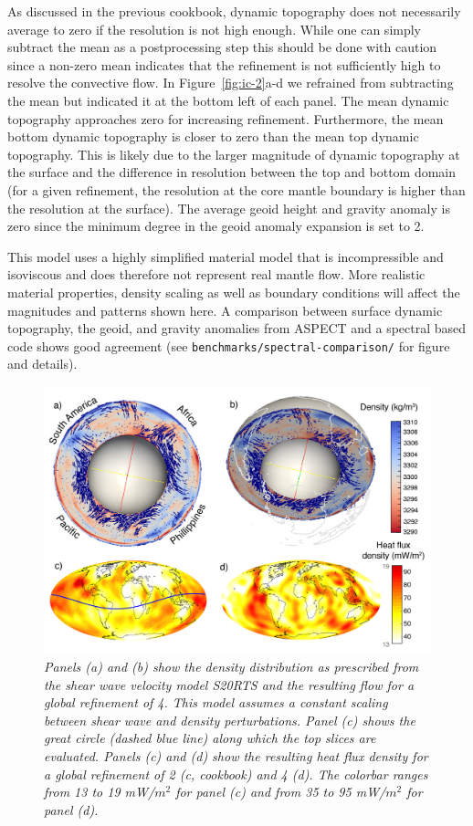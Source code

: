 \documentclass{article}
\begin{document}
As discussed in the previous cookbook, dynamic topography does not necessarily
average to zero if the resolution is not high enough. While one can simply subtract
the mean as a postprocessing step this should be done with caution since a non-zero
mean indicates that the refinement is not sufficiently high to resolve the
convective flow. In Figure~\ref{fig:ic-2}a-d we refrained from subtracting the mean but
indicated it at the bottom left of each panel. The mean dynamic
topography approaches zero for increasing refinement. Furthermore, the mean bottom
dynamic topography is closer to zero than the mean top dynamic topography. This is
likely due to the larger magnitude of dynamic topography at the surface and the
difference in resolution between the top and bottom domain
(for a given refinement, the resolution at the core mantle boundary is
higher than the resolution at the surface). The average geoid height and gravity anomaly
is zero since the minimum degree in the geoid anomaly expansion is set to 2.

This model uses a highly simplified material model that is incompressible and
isoviscous and does therefore not represent real mantle flow. More realistic
material properties, density scaling as well as boundary conditions will affect the magnitudes
and patterns shown here. A comparison between surface dynamic topography, the geoid,
and gravity anomalies from ASPECT and a spectral based code shows good agreement
(see \texttt{benchmarks/spectral-comparison/} for figure and details).

\begin{figure}
  \includegraphics[width=\textwidth]{cookbooks/initial-condition-S20RTS/doc/Fig_cookbook_V4-01.png}
  \hfill
  \caption{\it Panels (a) and (b) show the density distribution as prescribed from the shear
  wave velocity model S20RTS and the resulting flow for a global refinement of 4. This
  model assumes a constant scaling between shear wave and density perturbations.
  Panel (c) shows the great circle (dashed blue line) along which the top slices
  are evaluated. Panels (c) and (d) show the resulting heat flux density for a global refinement of
  2 (c, cookbook) and 4 (d). The colorbar ranges from 13 to 19 mW/$m^2$ for panel (c) and
  from 35 to 95 mW/$m^2$ for panel (d).}
  \label{fig:ic-1}
\end{figure}
\end{document}
